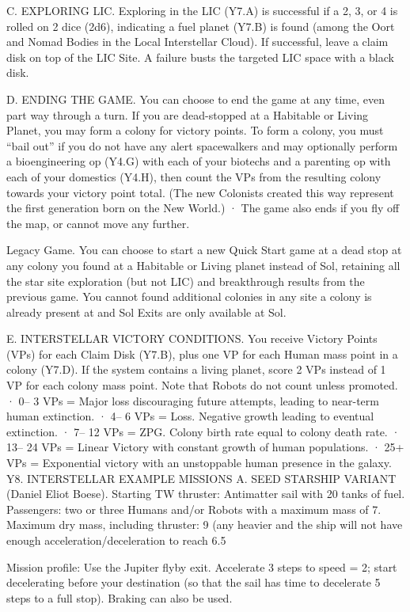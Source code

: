 \documentclass[a4paper]{book}
\begin{document}
C. EXPLORING LIC. Exploring in the LIC (Y7.A) is successful if a 2, 3, or 4 is rolled on 2 dice (2d6), indicating a fuel planet (Y7.B) is found (among the Oort and Nomad Bodies in the Local Interstellar Cloud). If successful, leave a claim disk on top of the LIC Site. A failure busts the targeted LIC space with a black disk.
 
D. ENDING THE GAME. You can choose to end the game at any time, even part way through a turn. If you are dead-stopped at a Habitable or Living Planet, you may form a colony for victory points. To form a colony, you must “bail out” if you do not have any alert spacewalkers and may optionally perform a bioengineering op (Y4.G) with each of your biotechs and a parenting op with each of your domestics (Y4.H), then count the VPs from the resulting colony towards your victory point total. (The new Colonists created this way represent the first generation born on the New World.)
·       The game also ends if you fly off the map, or cannot move any further.

Legacy Game. You can choose to start a new Quick Start game at a dead stop at any colony you found at a Habitable or Living planet instead of Sol, retaining all the star site exploration (but not LIC) and breakthrough results from the previous game. You cannot found additional colonies in any site a colony is already present at and Sol Exits are only available at Sol.
 
E. INTERSTELLAR VICTORY CONDITIONS. You receive Victory Points (VPs) for each Claim Disk (Y7.B), plus one VP for each Human mass point in a colony (Y7.D). If the system contains a living planet, score 2 VPs instead of 1 VP for each colony mass point. Note that Robots do not count unless promoted.
·       0– 3 VPs = Major loss discouraging future attempts, leading to near-term human extinction.
·       4– 6 VPs = Loss. Negative growth leading to eventual extinction.
·       7– 12 VPs = ZPG. Colony birth rate equal to colony death rate.
·       13– 24 VPs = Linear Victory with constant growth of human populations.
·       25+ VPs = Exponential victory with an unstoppable human presence in the galaxy.
Y8. INTERSTELLAR EXAMPLE MISSIONS
A. SEED STARSHIP VARIANT (Daniel Eliot Boese). Starting TW thruster: Antimatter sail with 20 tanks of fuel. Passengers: two or three Humans and/or Robots with a maximum mass of 7. Maximum dry mass, including thruster: 9 (any heavier and the ship will not have enough acceleration/deceleration to reach 6.5%

Mission profile: Use the Jupiter flyby exit. Accelerate 3 steps to speed = 2; start decelerating before your destination (so that the sail has time to decelerate 5 steps to a full stop). Braking can also be used.
\end{document}
